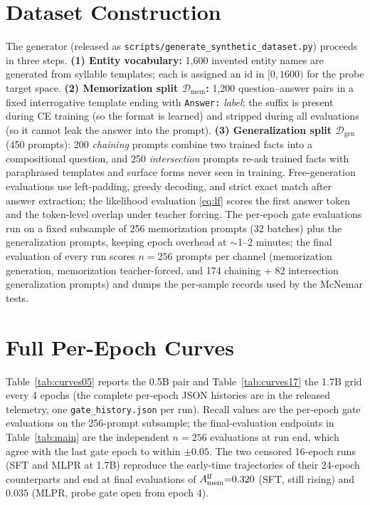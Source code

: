 \section{Dataset Construction}
\label{app:dataset}

The generator (released as
\texttt{scripts/generate\_synthetic\_dataset.py}) proceeds in three
steps. \textbf{(1) Entity vocabulary:} 1{,}600 invented entity names are
generated from syllable templates; each is assigned an id in
$[0, 1600)$ for the probe target space. \textbf{(2) Memorization split
$\mathcal{D}_{\mathrm{mem}}$:} 1{,}200 question--answer pairs in a fixed
interrogative template ending with \texttt{Answer:} \emph{label}; the
suffix is present during CE training (so the format is learned) and
stripped during all evaluations (so it cannot leak the answer into the
prompt). \textbf{(3) Generalization split $\mathcal{D}_{\mathrm{gen}}$}
(450 prompts): 200 \emph{chaining} prompts combine two trained facts
into a compositional question, and 250 \emph{intersection} prompts
re-ask trained facts with paraphrased templates and surface forms never
seen in training. Free-generation evaluations use left-padding,
greedy decoding, and strict exact match after answer extraction; the
likelihood evaluation \eqref{eq:lf} scores the first answer token and
the token-level overlap under teacher forcing. The per-epoch gate
evaluations run on a fixed subsample of 256 memorization prompts
(32 batches) plus the generalization prompts, keeping epoch overhead
at $\sim$1--2 minutes; the final evaluation of every run scores
$n{=}256$ prompts per channel (memorization generation, memorization
teacher-forced, and 174 chaining + 82 intersection generalization
prompts) and dumps the per-sample records used by the McNemar tests.

\section{Full Per-Epoch Curves}
\label{app:curves}

Table~\ref{tab:curves05} reports the 0.5B pair and
Table~\ref{tab:curves17} the 1.7B grid every 4 epochs (the complete
per-epoch JSON histories are in the released telemetry, one
\texttt{gate\_history.json} per run). Recall values are the per-epoch
gate evaluations on the 256-prompt subsample; the final-evaluation
endpoints in Table~\ref{tab:main} are the independent $n{=}256$
evaluations at run end, which agree with the last gate epoch to
within $\pm 0.05$. The two censored 16-epoch runs (SFT and MLPR at
1.7B) reproduce the early-time trajectories of their 24-epoch
counterparts and end at final evaluations of $A_{\mathrm{mem}}^{\mathrm{lf}}{=}0.320$ (SFT,
still rising) and $0.035$ (MLPR, probe gate open from epoch 4).

